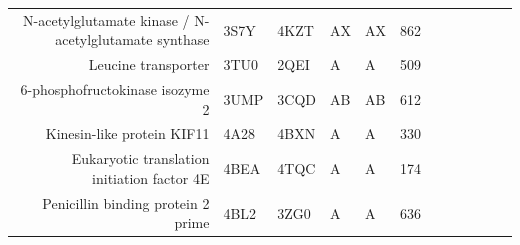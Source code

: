 \begin{table}
\begin{scriptsize}
\begin{tabular}{ r p{0.8cm} p{0.8cm} p{0.8cm} p{0.8cm} r r r r r r r }
\multicolumn{1}{r}{N-acetylglutamate kinase / N-acetylglutamate synthase} & \multicolumn{1}{l}{3S7Y} & \multicolumn{1}{l}{4KZT} & \multicolumn{1}{l}{AX} & \multicolumn{1}{l}{AX} & 862   & \cellcolor[rgb]{ 1,  .494,  .475}  & \cellcolor[rgb]{ 1,  .494,  .475}  & \cellcolor[rgb]{ .573,  .816,  .314}  & \cellcolor[rgb]{ 1,  .494,  .475}  & \cellcolor[rgb]{ 1,  .494,  .475}  & \cellcolor[rgb]{ 1,  .494,  .475}  \\
\multicolumn{1}{r}{Leucine transporter} & \multicolumn{1}{l}{3TU0} & \multicolumn{1}{l}{2QEI} & \multicolumn{1}{l}{A} & \multicolumn{1}{l}{A} & 509   & \cellcolor[rgb]{ .573,  .816,  .314}  & \cellcolor[rgb]{ .573,  .816,  .314}  & \cellcolor[rgb]{ 1,  .494,  .475}  & \cellcolor[rgb]{ .573,  .816,  .314}  & \cellcolor[rgb]{ .573,  .816,  .314}  & \cellcolor[rgb]{ .573,  .816,  .314}  \\
\multicolumn{1}{r}{6-phosphofructokinase isozyme 2} & \multicolumn{1}{l}{3UMP} & \multicolumn{1}{l}{3CQD} & \multicolumn{1}{l}{AB} & \multicolumn{1}{l}{AB} & 612   & \cellcolor[rgb]{ .573,  .816,  .314}  & \cellcolor[rgb]{ .573,  .816,  .314}  & \cellcolor[rgb]{ .573,  .816,  .314}  & \cellcolor[rgb]{ 1,  .494,  .475}  & \cellcolor[rgb]{ .573,  .816,  .314}  & \cellcolor[rgb]{ 1,  .494,  .475}  \\
\multicolumn{1}{r}{Kinesin-like protein KIF11} & \multicolumn{1}{l}{4A28} & \multicolumn{1}{l}{4BXN} & \multicolumn{1}{l}{A} & \multicolumn{1}{l}{A} & 330   & \cellcolor[rgb]{ .573,  .816,  .314}  & \cellcolor[rgb]{ .573,  .816,  .314}  & \cellcolor[rgb]{ .573,  .816,  .314}  & \cellcolor[rgb]{ .573,  .816,  .314}  & \cellcolor[rgb]{ .573,  .816,  .314}  & \cellcolor[rgb]{ .573,  .816,  .314}  \\
\multicolumn{1}{r}{Eukaryotic translation initiation factor 4E} & \multicolumn{1}{l}{4BEA} & \multicolumn{1}{l}{4TQC} & \multicolumn{1}{l}{A} & \multicolumn{1}{l}{A} & 174   & \cellcolor[rgb]{ 1,  .494,  .475}  & \cellcolor[rgb]{ 1,  .494,  .475}  & \cellcolor[rgb]{ 1,  1,  0}  & \cellcolor[rgb]{ 1,  .494,  .475}  & \cellcolor[rgb]{ 1,  .494,  .475}  & \cellcolor[rgb]{ 1,  .494,  .475}  \\
\multicolumn{1}{r}{Penicillin binding protein 2 prime} & \multicolumn{1}{l}{4BL2} & \multicolumn{1}{l}{3ZG0} & \multicolumn{1}{l}{A} & \multicolumn{1}{l}{A} & 636   & \cellcolor[rgb]{ 1,  .494,  .475}  & \cellcolor[rgb]{ .573,  .816,  .314}  & \cellcolor[rgb]{ 1,  .494,  .475}  & \cellcolor[rgb]{ 1,  .494,  .475}  & \cellcolor[rgb]{ 1,  .494,  .475}  & \cellcolor[rgb]{ 1,  .494,  .475}  \\

\end{tabular}
\end{scriptsize}
\end{table}
